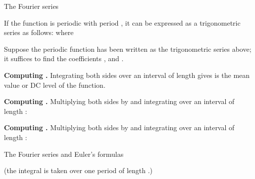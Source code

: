 \begin{EMtheorem}{The Fourier series}

If the function  is periodic with period \EMim{2\pi}, it can be expressed as a trigonometric series as follows:
where

\end{EMtheorem}

\begin{EMproof}

Suppose the periodic function has been written as the trigonometric series above; it suffices to find the coefficients ,  and .

\textbf{Computing .} Integrating both sides over an interval of length \EMim{2\pi} gives
 is the mean value or DC level of the function.

\textbf{Computing .} Multiplying both sides by  and integrating over an interval of length \EMim{2\pi}:

\textbf{Computing .} Multiplying both sides by  and integrating over an interval of length \EMim{2\pi}:

\end{EMproof}

\begin{EMimportant}{The Fourier series and Euler's formulas}

(the integral is taken over one period of length \EMim{2\pi}.)

\end{EMimportant}

